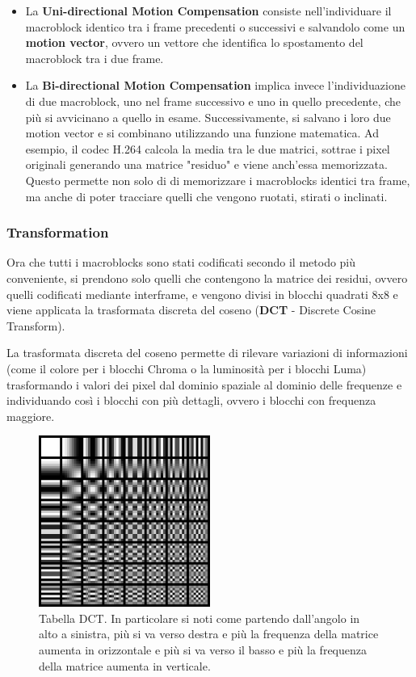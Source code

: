 \documentclass[a4paper,12pt, oneside]{article}
\begin{document}
\begin{itemize}
  \item La \textbf{Uni-directional Motion Compensation} consiste nell'individuare il macroblock identico
  tra i frame precedenti o successivi e salvandolo come un \textbf{motion vector}, ovvero un vettore che
  identifica lo spostamento del macroblock tra i due frame.
  \item La \textbf{Bi-directional Motion Compensation} implica invece l'individuazione di due macroblock,
  uno nel frame successivo e uno in quello precedente, che più si avvicinano a quello in esame.
  Successivamente, si salvano i loro due motion vector e si combinano utilizzando una funzione matematica.
  Ad esempio, il codec H.264 calcola la media tra le due matrici, sottrae i pixel originali generando una
  matrice "residuo" e viene anch'essa memorizzata. Questo permette non solo di di memorizzare i
  macroblocks identici tra frame, ma anche di poter tracciare quelli che vengono ruotati, stirati o inclinati.
\end{itemize}

\subsubsection{Transformation}
Ora che tutti i macroblocks sono stati codificati secondo il metodo più conveniente, si prendono solo quelli che contengono
la matrice dei residui, ovvero quelli codificati mediante interframe, e vengono divisi in blocchi quadrati 8x8
e viene applicata la trasformata discreta del coseno (\textbf{DCT} - Discrete Cosine Transform).

La trasformata discreta del coseno permette di rilevare variazioni di informazioni (come il colore per
i blocchi Chroma o la luminosità per i blocchi Luma) trasformando i valori dei pixel dal dominio
spaziale al dominio delle frequenze e individuando così i blocchi con più dettagli, ovvero i blocchi
con frequenza maggiore.

\begin{figure}[h]
    \centering
    \includegraphics[width=0.5\textwidth]{images/DCT-table.png}
    \caption{Tabella DCT. In particolare si noti come partendo dall'angolo in alto a sinistra,
    più si va verso destra e più la frequenza della matrice aumenta in orizzontale e più si va
    verso il basso e più la frequenza della matrice aumenta in verticale.}
    \label{fig:DCT_table}
\end{figure}
\end{document}
